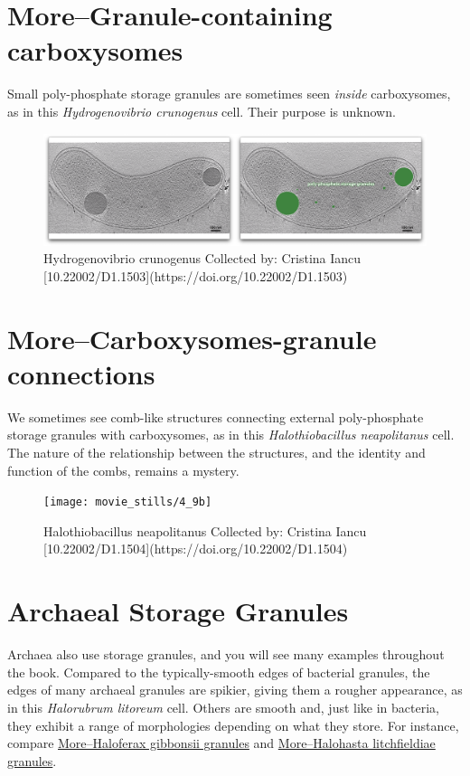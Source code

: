 \documentclass[]{tufte-book}
\begin{document}
\section{More--Granule-containing
carboxysomes}\label{moregranule-containing-carboxysomes}

Small poly-phosphate storage granules are sometimes seen \emph{inside}
carboxysomes, as in this \emph{Hydrogenovibrio crunogenus} cell. Their
purpose is unknown.

\begin{figure}
\includegraphics{movie_stills/4_9a} \caption[Hydrogenovibrio crunogenus Collected by]{Hydrogenovibrio crunogenus Collected by: Cristina Iancu [10.22002/D1.1503](https://doi.org/10.22002/D1.1503)}\label{fig:unnamed-chunk-75}
\end{figure}

\section{More--Carboxysomes-granule
connections}\label{morecarboxysomes-granule-connections}

We sometimes see comb-like structures connecting external poly-phosphate
storage granules with carboxysomes, as in this \emph{Halothiobacillus
neapolitanus} cell. The nature of the relationship between the
structures, and the identity and function of the combs, remains a
mystery.

\begin{figure}
\texttt{[image: movie\_stills/4\_9b]} \caption[Halothiobacillus neapolitanus Collected by]{Halothiobacillus neapolitanus Collected by: Cristina Iancu [10.22002/D1.1504](https://doi.org/10.22002/D1.1504)}\label{fig:unnamed-chunk-76}
\end{figure}

\section{Archaeal Storage Granules}\label{archaeal-storage-granules}

Archaea also use storage granules, and you will see many examples
throughout the book. Compared to the typically-smooth edges of bacterial
granules, the edges of many archaeal granules are spikier, giving them a
rougher appearance, as in this \emph{Halorubrum litoreum} cell. Others
are smooth and, just like in bacteria, they exhibit a range of
morphologies depending on what they store. For instance, compare
\protect\hyperlink{morehaloferax-gibbonsii-granules}{More--Haloferax
gibbonsii granules} and
\protect\hyperlink{morehalohasta-litchfieldiae-granules}{More--Halohasta
litchfieldiae granules}.
\end{document}
